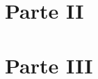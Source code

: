 







\tableofcontents
\newpage



%

\section{Parte II}
\label{sec_parteii}


\section{Parte III}


%



